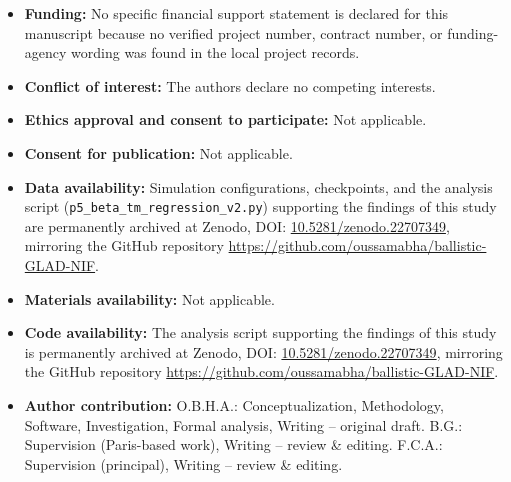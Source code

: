 \documentclass[aip,jcp,amsmath,amssymb,reprint]{revtex4-1}
\begin{document}
\begin{itemize}
\item \textbf{Funding:} No specific financial support statement is declared
  for this manuscript because no verified project number, contract number, or
  funding-agency wording was found in the local project records.
\item \textbf{Conflict of interest:} The authors declare no competing interests.
\item \textbf{Ethics approval and consent to participate:} Not applicable.
\item \textbf{Consent for publication:} Not applicable.
\item \textbf{Data availability:} Simulation configurations, checkpoints, and
  the analysis script (\texttt{p5\_beta\_tm\_regression\_v2.py}) supporting
  the findings of this study are permanently archived at Zenodo,
  DOI: \href{https://doi.org/10.5281/zenodo.22707349}{10.5281/zenodo.22707349},
  mirroring the GitHub repository \url{https://github.com/oussamabha/ballistic-GLAD-NIF}.
\item \textbf{Materials availability:} Not applicable.
\item \textbf{Code availability:} The analysis script supporting the findings
  of this study is permanently archived at Zenodo,
  DOI: \href{https://doi.org/10.5281/zenodo.22707349}{10.5281/zenodo.22707349},
  mirroring the GitHub repository \url{https://github.com/oussamabha/ballistic-GLAD-NIF}.
\item \textbf{Author contribution:} O.B.H.A.: Conceptualization, Methodology,
  Software, Investigation, Formal analysis, Writing -- original draft. B.G.:
  Supervision (Paris-based work), Writing -- review \& editing. F.C.A.:
  Supervision (principal), Writing -- review \& editing.
\end{itemize}



\end{document}
